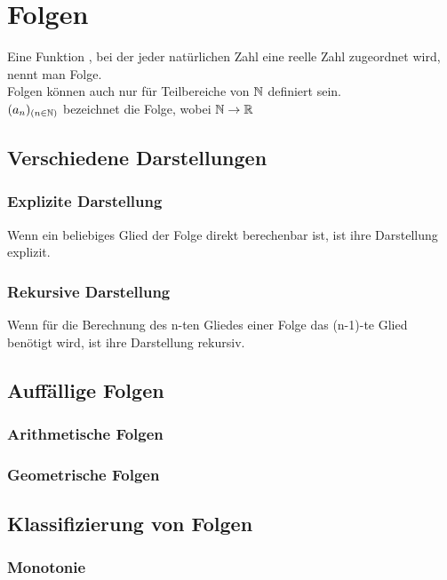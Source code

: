 \chapter{Folgen}

Eine Funktion , bei der jeder natürlichen Zahl eine reelle Zahl zugeordnet wird, nennt man Folge.\\
Folgen können auch nur für Teilbereiche von $\mathbb{N}$ definiert sein.\\
$(a_{n})_{(n\in\mathbb{N})}$ bezeichnet die Folge, wobei $\mathbb{N}\rightarrow\mathbb{R}$\\


\section{Verschiedene Darstellungen}


\subsection{Explizite Darstellung}

Wenn ein beliebiges Glied der Folge direkt berechenbar ist, ist ihre Darstellung explizit.

\subsection{Rekursive Darstellung}

Wenn für die Berechnung des n-ten Gliedes einer Folge das (n-1)-te Glied benötigt wird, ist ihre Darstellung rekursiv.


\section{Auffällige Folgen}


\subsection{Arithmetische Folgen}

\subsection{Geometrische Folgen}


\section{Klassifizierung von Folgen}


\subsection{Monotonie}

